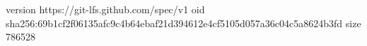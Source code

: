 version https://git-lfs.github.com/spec/v1
oid sha256:69b1cf2f06135afc9c4b64ebaf21d394612e4cf5105d057a36c04c5a8624b3fd
size 786528
